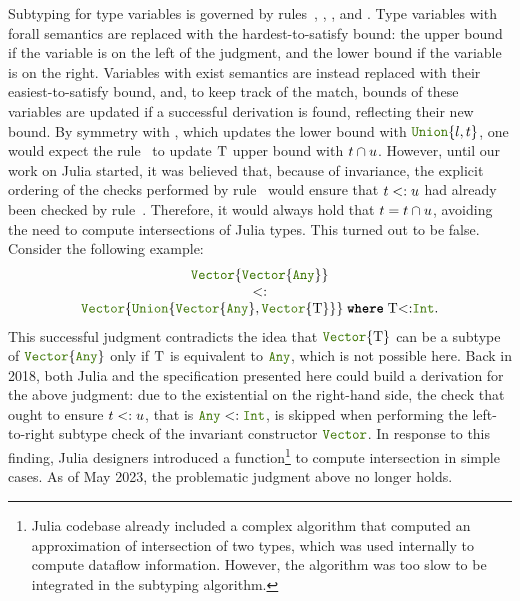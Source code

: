 Subtyping for type variables is governed by
rules~, ,
, and .  Type variables
with forall semantics are replaced with the hardest-to-satisfy bound:
the upper bound if the variable is on the left of the judgment, and
the lower bound if the variable is on the right.  Variables with exist
semantics are instead replaced with their easiest-to-satisfy bound,
and, to keep track of the match, bounds of these variables are updated
if a successful derivation is found, reflecting their new bound.  By
symmetry with , which updates the lower bound with
$\uniontyp{l,\t}$, one would expect the rule~ to update
\(\mathrm{T}\) upper bound with \(t \cap u\). 
However, until our work on Julia started, it
was believed that, because of invariance, the explicit ordering of the
checks performed by rule~ would ensure that \(t <: u\) had
already been checked by rule~.  Therefore, it
would always hold that \(t = t \cap u\), avoiding the need
to compute intersections of Julia types. This
turned out to be false.  Consider the following example:
\[
  \begin{array}{c}
    \vectyp{\vectyp{\anytyp}} \\
    <: \\
    \wheret{\vectyp{\uniontyp{\vectyp{\anytyp}, \vectyp{\T}}}}{\T{<:}\inttyp}.  
  \end{array}
\]\label{juliabug:rleft}%
\noindent
This successful judgment contradicts the idea that \(\vectyp{\T}\)
can be a subtype of \(\vectyp{\anytyp}\) only if \(\mathrm{T}\) is
equivalent to \(\anytyp\), which is not possible here.
Back in 2018,
both Julia and the specification presented here 
could build a derivation for the above judgment: due to
the existential on the right-hand side, the check that ought to ensure
\(t <: u\), that is \(\anytyp <: \inttyp\), is skipped when
performing the left-to-right subtype check of the invariant
constructor \(\jlname{Vector}\). 
In response to this finding, Julia designers introduced a
 function\footnote{Julia codebase already included a complex
algorithm that computed an approximation of intersection of two types, which
was used internally to compute dataflow information. However, the algorithm 
was too slow %
to be integrated in the subtyping algorithm.}
to compute intersection in simple cases.
As of May 2023, the problematic judgment above no longer holds.

